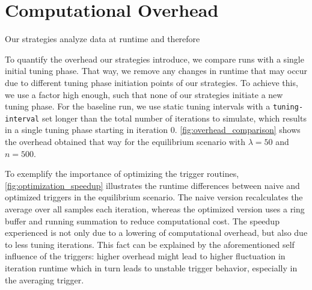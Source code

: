 \section{Computational Overhead}
\label{sec:overhead_results}
Our strategies analyze data at runtime and therefore \textellipsis

To quantify the overhead our strategies introduce, we compare runs with a single initial tuning phase. That way, we remove any changes in runtime that may occur due to different tuning phase initiation points of our strategies. To achieve this, we use a factor high enough, such that none of our strategies initiate a new tuning phase. For the baseline run, we use static tuning intervals with a \texttt{tuning-interval} set longer than the total number of iterations to simulate, which results in a single tuning phase starting in iteration \num{0}. \autoref{fig:overhead_comparison} shows the overhead obtained that way for the equilibrium scenario with $\lambda=50$ and $n=500$.


To exemplify the importance of optimizing the trigger routines, \autoref{fig:optimization_speedup} illustrates the runtime differences between naive and optimized triggers in the equilibrium scenario. The naive version recalculates the average over all samples each iteration, whereas the optimized version uses a ring buffer and running summation to reduce computational cost.
The speedup experienced is not only due to a lowering of computational overhead, but also due to less tuning iterations. This fact can be explained by the aforementioned self influence of the triggers: higher overhead might lead to higher fluctuation in iteration runtime which in turn leads to unstable trigger behavior, especially in the averaging trigger.



